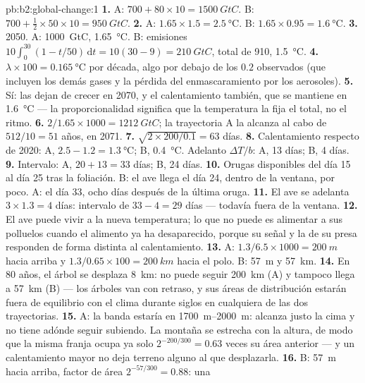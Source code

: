 \begin{solution}{pb:b2:global-change:1}
\textbf{1.} A: $700 + 80\times 10 = \qty{1500}{GtC}$. B: $700 +
\tfrac12\times 50\times 10 = \qty{950}{GtC}$.
\textbf{2.} A: $1.65\times 1.5 = \qty{2.5}{\celsius}$. B:
$1.65\times 0.95 = \qty{1.6}{\celsius}$.
\textbf{3.} 2050. A: \qty{1000}{GtC}, \qty{1.65}{\celsius}. B:
emisiones $10\int_0^{30}(1 - t/50)\,\mathrm{d}t = 10(30 - 9) =
\qty{210}{GtC}$, total de 910, \qty{1.5}{\celsius}.
\textbf{4.} $\lambda\times 100 = \qty{0.165}{\celsius}$ por década,
algo por debajo de los $0.2$ observados (que incluyen los demás gases y
la pérdida del enmascaramiento por los aerosoles).
\textbf{5.} Sí: las  dejan de crecer en 2070, y el
calentamiento también, que se mantiene en \qty{1.6}{\celsius} --- la
proporcionalidad significa que la temperatura la fija el total, no el
ritmo.
\textbf{6.} $2/1.65\times 1000 = \qty{1212}{GtC}$; la trayectoria A la
alcanza al cabo de $512/10 = 51$ años, en 2071.
\textbf{7.} $\sqrt{2\times 200/0.1} = 63$ días.
\textbf{8.} Calentamiento respecto de 2020: A, $2.5 - 1.2 =
\qty{1.3}{\celsius}$; B, \qty{0.4}{\celsius}. Adelanto $\Delta T/b$:
A, 13 días; B, 4 días.
\textbf{9.} Intervalo: A, $20 + 13 = 33$ días; B, 24 días.
\textbf{10.} Orugas disponibles del día 15 al día 25 tras la foliación.
B: el ave llega el día 24, dentro de la ventana, por poco. A: el día 33,
ocho días después de la última oruga.
\textbf{11.} El ave se adelanta $3\times 1.3 = 4$ días: intervalo de $33 - 4 =
29$ días --- todavía fuera de la ventana.
\textbf{12.} El ave puede vivir a la nueva temperatura; lo que no puede es
alimentar a sus polluelos cuando el alimento ya ha desaparecido, porque su
señal y la de su presa responden de forma distinta al calentamiento.
\textbf{13.} A: $1.3/6.5\times 1000 = \qty{200}{m}$ hacia arriba y
$1.3/0.65\times 100 = \qty{200}{km}$ hacia el polo. B: \qty{57}{m} y
\qty{57}{km}.
\textbf{14.} En 80 años, el árbol se desplaza \qty{8}{km}: no puede seguir
\qty{200}{km} (A) y tampoco llega a \qty{57}{km} (B) --- los árboles van
con retraso, y sus áreas de distribución estarán fuera de equilibrio con el
clima durante siglos en cualquiera de las dos trayectorias.
\textbf{15.} A: la banda estaría en \qtyrange{1700}{2000}{m}: alcanza
justo la cima y no tiene adónde seguir subiendo. La montaña se estrecha
con la altura, de modo que la misma franja ocupa ya solo $2^{-200/300} =
0.63$ veces su área anterior --- y un calentamiento mayor no deja terreno
alguno al que desplazarla.
\textbf{16.} B: \qty{57}{m} hacia arriba, factor de área $2^{-57/300} = 0.88$: una

\end{solution}
